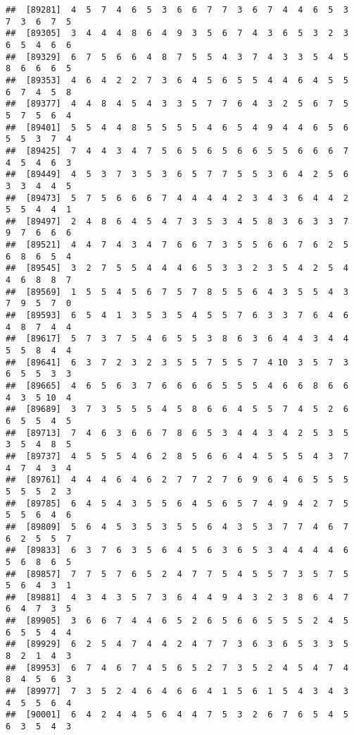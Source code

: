 \documentclass[
]{book}
\begin{document}
\begin{verbatim}
##  [89281]  4  5  7  4  6  5  3  6  6  7  7  3  6  7  4  4  6  5  3  7  3  6  7  5
##  [89305]  3  4  4  4  8  6  4  9  3  5  6  7  4  3  6  5  3  2  3  6  5  4  6  6
##  [89329]  6  7  5  6  6  4  8  7  5  5  4  3  7  4  3  3  5  4  5  8  6  6  6  5
##  [89353]  4  6  4  2  2  7  3  6  4  5  6  5  5  4  4  6  4  5  5  6  7  4  5  8
##  [89377]  4  4  8  4  5  4  3  3  5  7  7  6  4  3  2  5  6  7  5  5  7  5  6  4
##  [89401]  5  5  4  4  8  5  5  5  5  4  6  5  4  9  4  4  6  5  6  5  5  3  7  4
##  [89425]  7  4  4  3  4  7  5  6  5  6  5  6  6  5  5  6  6  6  7  4  5  4  6  3
##  [89449]  4  5  3  7  3  5  3  6  5  7  7  5  5  3  6  4  2  5  6  3  3  4  4  5
##  [89473]  5  7  5  6  6  6  7  4  4  4  4  2  3  4  3  6  4  4  2  5  5  4  4  1
##  [89497]  2  4  8  6  4  5  4  7  3  5  3  4  5  8  3  6  3  3  7  9  7  6  6  6
##  [89521]  4  4  7  4  3  4  7  6  6  7  3  5  5  6  6  7  6  2  5  6  8  6  5  4
##  [89545]  3  2  7  5  5  4  4  4  6  5  3  3  2  3  5  4  2  5  4  4  6  8  8  7
##  [89569]  1  5  5  4  5  6  7  5  7  8  5  5  6  4  3  5  5  4  3  7  9  5  7  0
##  [89593]  6  5  4  1  3  5  3  5  4  5  5  7  6  3  3  7  6  4  6  4  8  7  4  4
##  [89617]  5  7  3  7  5  4  6  5  5  3  8  6  3  6  4  4  3  4  4  5  5  8  4  4
##  [89641]  6  3  7  2  3  2  3  5  5  7  5  5  7  4 10  3  5  7  3  6  5  5  3  3
##  [89665]  4  6  5  6  3  7  6  6  6  6  5  5  5  4  6  6  8  6  6  4  3  5 10  4
##  [89689]  3  7  3  5  5  5  4  5  8  6  6  4  5  5  7  4  5  2  6  6  5  5  4  5
##  [89713]  7  4  6  3  6  6  7  8  6  5  3  4  4  3  4  2  5  3  5  3  5  4  8  5
##  [89737]  4  5  5  5  4  6  2  8  5  6  6  4  4  5  5  5  4  3  7  4  7  4  3  4
##  [89761]  4  4  4  6  4  6  2  7  7  2  7  6  9  6  4  6  5  5  5  5  5  5  2  3
##  [89785]  6  4  5  4  3  5  5  6  4  5  6  5  7  4  9  4  2  7  5  5  5  6  4  6
##  [89809]  5  6  4  5  3  5  3  5  5  6  4  3  5  3  7  7  4  6  7  6  2  5  5  7
##  [89833]  6  3  7  6  3  5  6  4  5  6  3  6  5  3  4  4  4  4  6  5  6  8  6  5
##  [89857]  7  7  5  7  6  5  2  4  7  7  5  4  5  5  7  3  5  7  5  5  6  4  3  1
##  [89881]  4  3  4  3  5  7  3  6  4  4  9  4  3  2  3  8  6  4  7  6  4  7  3  5
##  [89905]  3  6  6  7  4  4  6  5  2  6  5  6  6  5  5  5  2  4  5  6  5  5  4  4
##  [89929]  6  2  5  4  7  4  4  2  4  7  7  3  6  3  6  5  3  3  5  8  2  1  4  3
##  [89953]  6  7  4  6  7  4  5  6  5  2  7  3  5  2  4  5  4  7  4  8  4  5  6  3
##  [89977]  7  3  5  2  4  6  4  6  6  4  1  5  6  1  5  4  3  4  3  4  5  5  6  4
##  [90001]  6  4  2  4  4  5  6  4  4  7  5  3  2  6  7  6  5  4  5  6  3  5  4  3

\end{verbatim}
\end{document}
